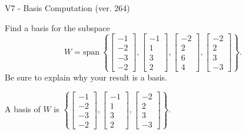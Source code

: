 \begin{exercise}
  \begin{exerciseTitle}V7 - Basis Computation (ver. 264)\end{exerciseTitle}
  \begin{exerciseStatement}
    Find a basis for the subspace 
\[W=\mathrm{span}\ \left\{\left[\begin{array}{r}
-1 \\
-2 \\
-3 \\
-2
\end{array}\right] , \left[\begin{array}{r}
-1 \\
1 \\
3 \\
2
\end{array}\right] , \left[\begin{array}{r}
-2 \\
2 \\
6 \\
4
\end{array}\right] , \left[\begin{array}{r}
-2 \\
2 \\
3 \\
-3
\end{array}\right]\right\}.\]
 Be sure to explain why your result is a basis.


  \end{exerciseStatement}
  \begin{exerciseAnswer}
   A basis of \(W\) is  \(\left\{\left[\begin{array}{r}
-1 \\
-2 \\
-3 \\
-2
\end{array}\right] , \left[\begin{array}{r}
-1 \\
1 \\
3 \\
2
\end{array}\right] , \left[\begin{array}{r}
-2 \\
2 \\
3 \\
-3
\end{array}\right]\right\}\).
  


  \end{exerciseAnswer}
\end{exercise}